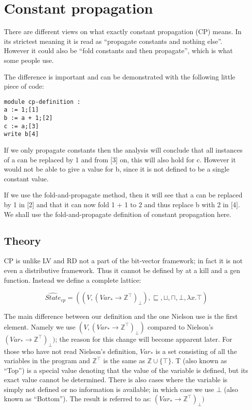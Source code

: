 \section{Constant propagation}
There are different views on what exactly constant propagation (CP) means. In its
strictest meaning it is read as ``propagate constants and nothing else''.
However it could also be ``fold constants and then propagate'', which is what
some people use.

  The difference is important and can be demonstrated with the following little
piece of code:

\begin{lstlisting}
module cp-definition :
a := 1;[1]
b := a + 1;[2]
c := a;[3]
write b[4]
\end{lstlisting}

If we only propagate constants then the analysis will conclude that all instances
of a can be replaced by 1 and from [3] on, this will also hold for c. However it
would not be able to give a value for b, since it is not defined to be a 
single constant value.

  If we use the fold-and-propagate method, then it will see that a can be replaced
by 1 in [2] and that it can now fold 1 + 1 to 2 and thus replace b with 2 in [4].
We shall use the fold-and-propagate definition of constant propagation here.

\subsection{Theory}
CP is unlike LV and RD not a part of the bit-vector framework; in fact it is not
even a distributive framework. Thus it cannot be defined by at a kill and a gen
function. Instead we define a complete lattice:

\[ \hat{State}_{cp} = ((V, (Var_{*} \rightarrow \mathbb{Z}^{\top})_\bot), \sqsubseteq, \sqcup, \sqcap, \bot, \lambda x.\top) \]

\docpar
The main difference between our definition and the one Nielson use is the first
element. Namely we use $(V, (Var_{*} \rightarrow \mathbb{Z}^{\top})_\bot)$
compared to Nielson's $(Var_{*} \rightarrow \mathbb{Z}^{\top})_\bot)$; the
reason for this change will become apparent later.
  For those who have not read Nielson's definition, $Var_{*}$ is a set consisting
of all the variables in the program and $\mathbb{Z}^\top$ is the same as
$\mathbb{Z} \cup \{\top\}$. T (also known as ``Top'') is a special value denoting
that the value of the variable is defined, but its exact value cannot be
determined. There is also cases where the variable is simply not defined or
no information is available; in which case we use $\bot$ (also known as
``Bottom''). The result is referred to as:
 $(Var_{*} \rightarrow \mathbb{Z}^{\top})_\bot)$

